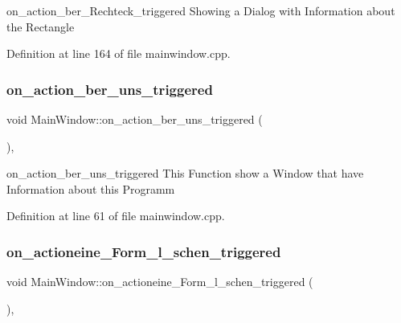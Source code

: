 on\+\_\+action\+\_\+ber\+\_\+\+Rechteck\+\_\+triggered Showing a Dialog with Information about the Rectangle 



Definition at line 164 of file mainwindow.\+cpp.

\mbox{\label{class_main_window_abfc114d19ba20fd03b5250ab9bcd6800}} 
\subsubsection{\texorpdfstring{on\+\_\+action\+\_\+ber\+\_\+uns\+\_\+triggered}{on\_action\_ber\_uns\_triggered}}
{\footnotesize\ttfamily void Main\+Window\+::on\+\_\+action\+\_\+ber\+\_\+uns\+\_\+triggered (\begin{DoxyParamCaption}{ }\end{DoxyParamCaption})\hspace{0.3cm}{\ttfamily [private]}, {\ttfamily [slot]}}



on\+\_\+action\+\_\+ber\+\_\+uns\+\_\+triggered This Function show a Window that have Information about this Programm 



Definition at line 61 of file mainwindow.\+cpp.

\mbox{\label{class_main_window_a8f8042443101ec9438d82078a16e8aae}} 
\subsubsection{\texorpdfstring{on\+\_\+actioneine\+\_\+\+Form\+\_\+l\+\_\+schen\+\_\+triggered}{on\_actioneine\_Form\_l\_schen\_triggered}}
{\footnotesize\ttfamily void Main\+Window\+::on\+\_\+actioneine\+\_\+\+Form\+\_\+l\+\_\+schen\+\_\+triggered (\begin{DoxyParamCaption}{ }\end{DoxyParamCaption})\hspace{0.3cm}{\ttfamily [private]}, {\ttfamily [slot]}}



